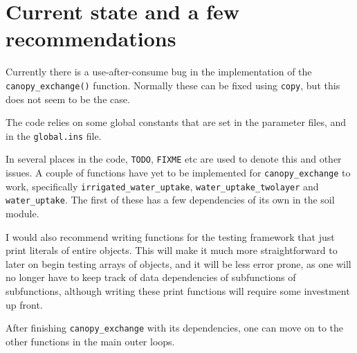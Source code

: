 \section{Current state and a few recommendations}
Currently there is a use-after-consume\cite{bug1} bug in the implementation of the \texttt{canopy_exchange()} function. Normally these can be fixed using \texttt{copy}, but this does not seem to be the case.

The code relies on some global constants that are set in the parameter files, and in the \texttt{global.ins} file.

In several places in the code, \texttt{TODO}, \texttt{FIXME} etc are used to denote this and other issues. A couple of functions have yet to be implemented for \texttt{canopy_exchange} to work, specifically
\texttt{irrigated_water_uptake}, \texttt{water_uptake_twolayer} and \texttt{water_uptake}. The first of these has a few dependencies of its own in the soil module.

I would also recommend writing functions for the testing framework that just print literals of entire objects. This will make it much more straightforward to later on begin testing arrays of objects, and it will be less error prone, as one will no longer have to keep track of data dependencies of subfunctions of subfunctions, although writing these print functions will require some investment up front.

After finishing \texttt{canopy_exchange} with its dependencies, one can move on to the other functions in the main outer loops.
